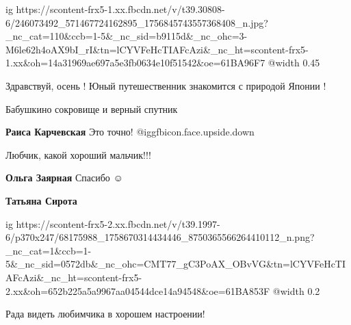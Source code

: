  
 
 
 
 

\ifcmt
  ig https://scontent-frx5-1.xx.fbcdn.net/v/t39.30808-6/246073492_571467724162895_1756845743557368408_n.jpg?_nc_cat=110&ccb=1-5&_nc_sid=b9115d&_nc_ohc=3-M6le62h4oAX9bI_rI&tn=lCYVFeHcTIAFcAzi&_nc_ht=scontent-frx5-1.xx&oh=14a31969ae697a5e3fb0634e10f51542&oe=61BA96F7
	@width 0.45
\fi


Здравствуй, осень ! Юный путешественник знакомится с природой Японии !

Бабушкино сокровище и верный спутник

\textbf{Раиса Карчевская} Это точно! @igg{fbicon.face.upside.down} 

Любчик, какой хороший мальчик!!!

\textbf{Ольга Заярная} Спасибо ☺ ️ 

\textbf{Татьяна Сирота}

\ifcmt
  ig https://scontent-frx5-2.xx.fbcdn.net/v/t39.1997-6/p370x247/68175988_1758670314434446_8750365566264410112_n.png?_nc_cat=1&ccb=1-5&_nc_sid=0572db&_nc_ohc=CMT77_gC3PoAX_OBvVG&tn=lCYVFeHcTIAFcAzi&_nc_ht=scontent-frx5-2.xx&oh=652b225a5a9967aa04544dce14a94548&oe=61BA853F
  @width 0.2
\fi

Рада видеть любимчика в хорошем настроении!

